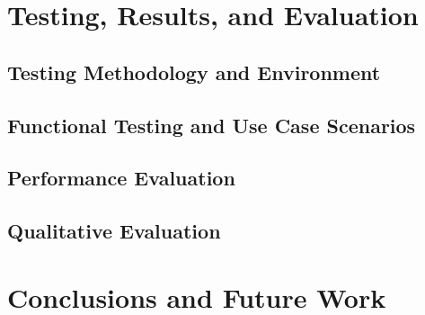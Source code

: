 \documentclass[12pt, a4paper]{article}
\begin{document}
\section{Testing, Results, and Evaluation}
    \subsection{Testing Methodology and Environment}
    \subsection{Functional Testing and Use Case Scenarios}
    \subsection{Performance Evaluation}
    \subsection{Qualitative Evaluation}

\section{Conclusions and Future Work}
\end{document}
